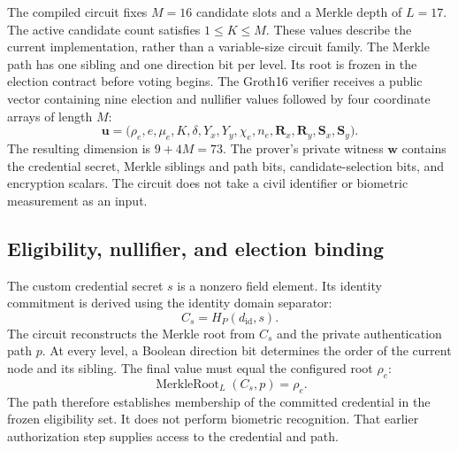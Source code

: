 The compiled circuit fixes $M=16$ candidate slots and a Merkle depth of
$L=17$. The active candidate count satisfies $1\leq K\leq M$.
These values describe the current implementation, rather than a variable-size
circuit family. The Merkle path has one sibling and one direction bit per
level. Its root is frozen in the election contract before voting begins.
The Groth16 verifier receives a public vector containing nine election and
nullifier values followed by four coordinate arrays of length $M$:
\begin{equation}
\label{eq:protocol-public-inputs}
\mathbf{u}=\bigl(
\rho_e,e,\mu_e,K,\delta,Y_x,Y_y,\chi_e,n_e,
\mathbf{R}_x,\mathbf{R}_y,\mathbf{S}_x,\mathbf{S}_y
\bigr).
\end{equation}
The resulting dimension is $9+4M=73$. The prover's private witness
$\mathbf{w}$ contains the credential secret, Merkle siblings and path
bits, candidate-selection bits, and encryption scalars. The circuit
does not take a civil identifier or biometric measurement as an input.


\subsection{Eligibility, nullifier, and election binding}
\label{subsec:protocol-eligibility}

The custom credential secret $s$ is a nonzero field element. Its identity
commitment is derived using the identity domain separator:
\begin{equation}
\label{eq:protocol-identity}
C_s=H_P(d_{\mathrm{id}},s).
\end{equation}
The circuit reconstructs the Merkle root from $C_s$ and the private
authentication path $p$. At every level, a Boolean direction bit determines
the order of the current node and its sibling. The final value must equal
the configured root $\rho_e$:
\begin{equation}
\label{eq:protocol-merkle}
\operatorname{MerkleRoot}_{L}(C_s,p)=\rho_e.
\end{equation}
The path therefore establishes membership of the committed credential in
the frozen eligibility set. It does not perform biometric recognition.
That earlier authorization step supplies access to the credential and path.

